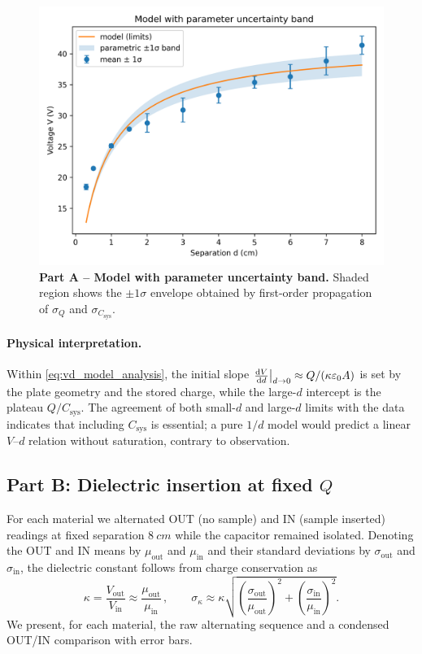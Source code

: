 \documentclass[12pt]{article}
\begin{document}
\begin{figure}[htbp]
\centering
\includegraphics[width=0.82\linewidth]{PartA_params_band.png}
\caption{\textbf{Part A -- Model with parameter uncertainty band.} Shaded region shows the \(\pm1\sigma\) envelope obtained by first-order propagation of \(\sigma_Q\) and \(\sigma_{C_{\mathrm{sys}}}\).}
\label{fig:band}
\end{figure}
\FloatBarrier

\paragraph{Physical interpretation.}
Within \cref{eq:vd_model_analysis}, the initial slope \( \dv{V}{d}\big|_{d\to 0} \approx Q/(\kappa\varepsilon_0 A) \) is set by the plate geometry and the stored charge, while the large-\(d\) intercept is the plateau \(Q/C_{\mathrm{sys}}\). The agreement of both small-\(d\) and large-\(d\) limits with the data indicates that including \(C_{\mathrm{sys}}\) is essential; a pure \(1/d\) model would predict a linear \(V\)–\(d\) relation without saturation, contrary to observation.

\subsection*{Part B: Dielectric insertion at fixed \(Q\)}

For each material we alternated OUT (no sample) and IN (sample inserted) readings at fixed separation \(\SI{8}{cm}\) while the capacitor remained isolated. Denoting the OUT and IN means by \(\mu_{\text{out}}\) and \(\mu_{\text{in}}\) and their standard deviations by \(\sigma_{\text{out}}\) and \(\sigma_{\text{in}}\), the dielectric constant follows from charge conservation as
\begin{equation}
    \kappa = \frac{V_{\text{out}}}{V_{\text{in}}} \approx \frac{\mu_{\text{out}}}{\mu_{\text{in}}}\,,
    \qquad
    \sigma_\kappa \approx \kappa\sqrt{\left(\frac{\sigma_{\text{out}}}{\mu_{\text{out}}}\right)^2
    + \left(\frac{\sigma_{\text{in}}}{\mu_{\text{in}}}\right)^2}.
    \label{eq:kappa_formula}
\end{equation}
We present, for each material, the raw alternating sequence and a condensed OUT/IN comparison with error bars.
\end{document}
